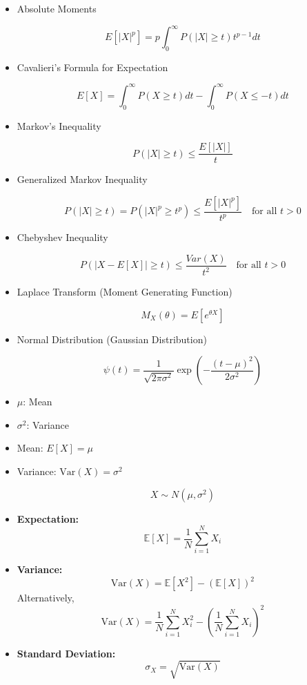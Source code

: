 \documentclass{article}
\begin{document}
\begin{itemize}
\item Absolute Moments

    \[
    E[|X|^p] = p \int_0^{\infty} P(|X| \ge t) t^{p-1} dt
    \]

\item Cavalieri's Formula for Expectation

    \[
    E[X] = \int_0^{\infty} P(X \ge t) dt - \int_0^{\infty} P(X \le -t) dt
    \]

\item Markov's Inequality

    \[
    P(|X| \ge t) \le \frac{E[|X|]}{t}
    \]

\item Generalized Markov Inequality

    \[
    P(|X| \ge t) = P(|X|^p \ge t^p) \le \frac{E[|X|^p]}{t^p} \quad \text{for all } t > 0
    \]

\item Chebyshev Inequality

    \[
    P(|X - E[X]| \ge t) \le \frac{Var(X)}{t^2} \quad \text{for all } t > 0
    \]

\item Laplace Transform (Moment Generating Function)

    \[
    M_X(\theta) = E[e^{\theta X}]
    \]

\item Normal Distribution (Gaussian Distribution)

  \[
    \psi(t) = \frac{1}{\sqrt{2\pi\sigma^2}} \exp\left(-\frac{(t - \mu)^2}{2\sigma^2}\right)
    \]
\item \(\mu\): Mean
\item \(\sigma^2\): Variance
 \item Mean: \(E[X] = \mu\)
        \item Variance: \(\text{Var}(X) = \sigma^2\)

        \[
    X \sim N(\mu, \sigma^2)
    \]

\item \textbf{Expectation:}
\[
\mathbb{E}[X] = \frac{1}{N} \sum_{i=1}^{N} X_i
\]

\item \textbf{Variance:}
\[
\text{Var}(X) = \mathbb{E}[X^2] - (\mathbb{E}[X])^2
\]
Alternatively,
\[
\text{Var}(X) = \frac{1}{N} \sum_{i=1}^{N} X_i^2 - \left( \frac{1}{N} \sum_{i=1}^{N} X_i \right)^2
\]

\item \textbf{Standard Deviation:}
\[
\sigma_X = \sqrt{\text{Var}(X)}
\]


\end{itemize}
\end{document}
